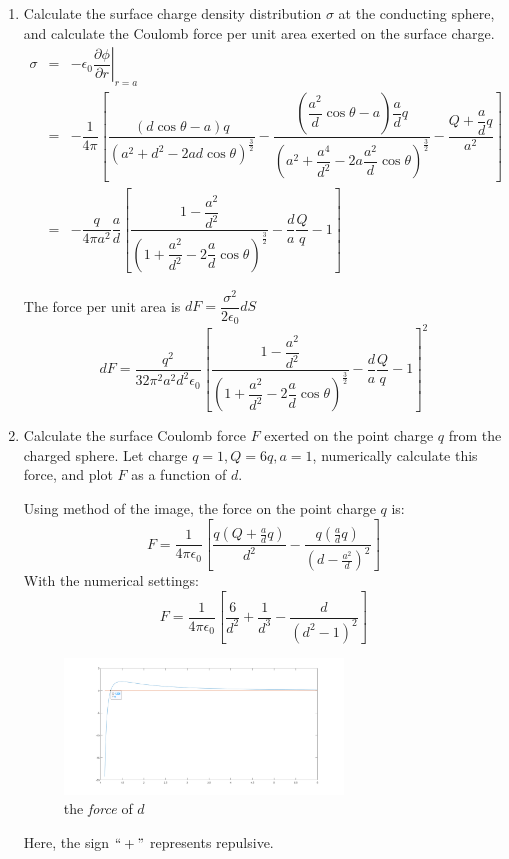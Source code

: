 \documentclass[a4paper,11pt]{article}
\begin{document}
\begin{enumerate}
\begin{enumerate}
    \item Calculate the surface charge density distribution $\sigma$ at the conducting sphere, and calculate the Coulomb force per unit area exerted on the surface charge.
    \begin{eqnarray}
      \sigma&=&-\epsilon_0\left.\dfrac{\partial\phi}{\partial r}\right|_{r=a}\nonumber \\
      &=&-\dfrac{1}{4\pi}\left[\dfrac{(d\cos\theta-a)q}{{(a^2+d^2-2ad\cos\theta)}^{\frac{3}{2}}}-\dfrac{(\dfrac{a^2}{d}\cos\theta-a)\dfrac{a}{d}q}{{(a^2+\dfrac{a^4}{d^2}-2a\dfrac{a^2}{d}\cos\theta)}^{\frac{3}{2}}}-\dfrac{Q+\dfrac{a}{d}q}{a^2}\right]\nonumber \\
      &=&-\dfrac{q}{4\pi a^2}\dfrac{a}{d}\left[\dfrac{1-\dfrac{a^2}{d^2}}{{(1+\dfrac{a^2}{d^2}-2\dfrac{a}{d}\cos\theta)}^{\frac{3}{2}}}-\dfrac{d}{a}\dfrac{Q}{q}-1\right]
    \end{eqnarray}

    The force per unit area is $dF=\dfrac{\sigma^2}{2\epsilon_0}dS$
    \begin{equation}
      dF=\dfrac{q^2}{32\pi^2a^2d^2\epsilon_0}\left[\dfrac{1-\dfrac{a^2}{d^2}}{{(1+\dfrac{a^2}{d^2}-2\dfrac{a}{d}\cos\theta)}^{\frac{3}{2}}}-\dfrac{d}{a}\dfrac{Q}{q}-1\right]^2
    \end{equation}

    \item Calculate the surface Coulomb force $F$ exerted on the point charge $q$ from the charged sphere. Let charge $q=1,Q=6q,a=1$, numerically calculate this force, and plot $F$ as a function of $d$.
    
    Using method of the image, the force on the point charge $q$ is:
    \begin{equation}
      F = \dfrac{1}{4\pi\epsilon_0}\left[\dfrac{q(Q+\frac{a}{d}q)}{d^2}-\dfrac{q(\frac{a}{d}q)}{(d-\frac{a^2}{d})^2}\right]
    \end{equation}
    With the numerical settings:
    \begin{equation}
      F = \dfrac{1}{4\pi\epsilon_0}\left[\dfrac{6}{d^2}+\dfrac{1}{d^3}-\dfrac{d}{(d^2-1)^2}\right]
    \end{equation}
    \begin{figure}[h]
      \centering
      \includegraphics[width=0.7\textwidth]{fig4.png}\caption{the \textit{force} of $d$}
    \end{figure}
    Here, the sign $``+"$ represents repulsive.


\end{enumerate}
\end{enumerate}
\end{document}
